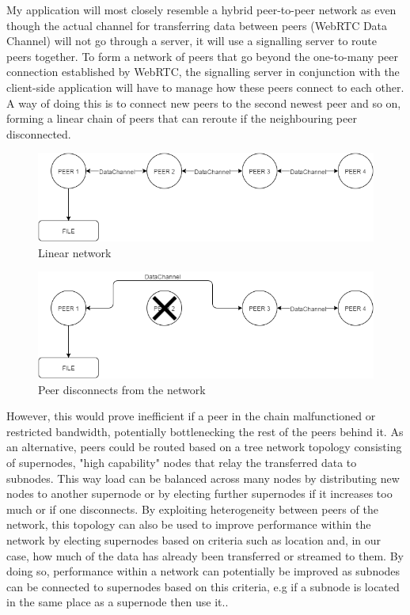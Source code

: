 \documentclass[]{report}
\begin{document}
	My application will most closely resemble a hybrid peer-to-peer network as even though the actual channel for transferring data between peers (WebRTC Data Channel) will not go through a server, it will use a signalling server to route peers together. To form a network of peers that go beyond the one-to-many peer connection established by WebRTC, the signalling server in conjunction with the client-side application will have to manage how these peers connect to each other. A way of doing this is to connect new peers to the second newest peer and so on, forming a linear chain of peers that can reroute if the neighbouring peer disconnected.
	\begin{figure}[H]
		\centering
		\caption{Linear network}
		\includegraphics[scale=0.4]{network.png}
	\end{figure}
	\begin{figure}[H]
		\centering
		\caption{Peer disconnects from the network}
		\includegraphics[scale=0.4]{peerdisconnect.png}
	\end{figure}
	However, this would prove inefficient if a peer in the chain malfunctioned or restricted bandwidth, potentially bottlenecking the rest of the peers behind it. As an alternative, peers could be routed based on a tree network topology \cite{Tree Topology} consisting of supernodes, "high capability" nodes that relay the transferred data to subnodes. This way load can be balanced across many nodes by distributing new nodes to another supernode or by electing further supernodes if it increases too much or if one disconnects. By exploiting heterogeneity between peers of the network, this topology can also be used to improve performance within the network by electing supernodes based on criteria such as location and, in our case, how much of the data has already been transferred or streamed to them. By doing so, performance within a network can potentially be improved as subnodes can be connected to supernodes based on this criteria, e.g if a subnode is located in the same place as a supernode then use it.\cite{Supernodes}.		
\end{document}
